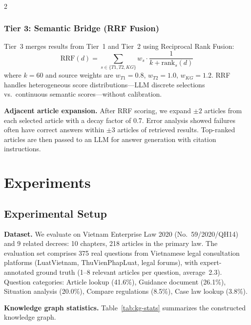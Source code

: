 \documentclass[11pt,a4paper]{article}
\begin{document}
\begin{multicols}{2}
\subsubsection{Tier 3: Semantic Bridge (RRF Fusion)}

Tier~3 merges results from Tier~1 and Tier~2 using Reciprocal Rank Fusion:
\begin{equation}
\text{RRF}(d) = \sum_{s \in \{T1, T2, KG\}} w_s \cdot \frac{1}{k + \text{rank}_s(d)}
\end{equation}
where $k=60$ and source weights are $w_{T1}=0.8$, $w_{T2}=1.0$, $w_{KG}=1.2$. RRF handles heterogeneous score distributions---LLM discrete selections vs.\ continuous semantic scores---without calibration.

\textbf{Adjacent article expansion.} After RRF scoring, we expand $\pm 2$ articles from each selected article with a decay factor of 0.7. Error analysis showed failures often have correct answers within $\pm 3$ articles of retrieved results. Top-ranked articles are then passed to an LLM for answer generation with citation instructions.

\section{Experiments}
\label{sec:experiments}

\subsection{Experimental Setup}

\textbf{Dataset.} We evaluate on Vietnam Enterprise Law 2020 (No.~59/2020/QH14) and 9 related decrees: 10 chapters, 218 articles in the primary law. The evaluation set comprises 375 real questions from Vietnamese legal consultation platforms (LuatVietnam, ThuVienPhapLuat, legal forums), with expert-annotated ground truth (1--8 relevant articles per question, average~2.3). Question categories: Article lookup (41.6\%), Guidance document (26.1\%), Situation analysis (20.0\%), Compare regulations (8.5\%), Case law lookup (3.8\%).

\textbf{Knowledge graph statistics.} Table~\ref{tab:kg-stats} summarizes the constructed knowledge graph.

\end{multicols}
\end{document}
